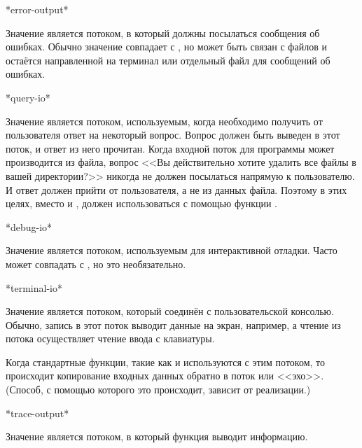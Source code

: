 \begin{defun}[Переменная]
*error-output*

Значение  является потоком, в который должны посылаться
сообщения об ошибках. Обычно значение совпадает с , но
 может быть связан с файлов и 
остаётся направленной на терминал или отдельный файл для сообщений об ошибках.
\end{defun}

\begin{defun}[Переменная]
*query-io*

Значение  является потоком, используемым, когда необходимо
получить от пользователя ответ на некоторый вопрос. Вопрос должен быть выведен в
этот поток, и ответ из него прочитан. Когда входной поток для программы может
производится из файла, вопрос <<Вы действительно хотите удалить все файлы в
вашей директории?>> никогда не должен посылаться напрямую к пользователю. И
ответ должен прийти от пользователя, а не из данных файла.
Поэтому в этих целях, вместо  и ,
должен использоваться  с помощью функции .
\end{defun}

\begin{defun}[Переменная]
*debug-io*

Значение  является потоком, используемым для интерактивной
отладки. Часто может совпадать с , но это необязательно.
\end{defun}

\begin{defun}[Переменная]
*terminal-io*

Значение  является потоком, который соединён с
пользовательской консолью. Обычно, запись в этот поток выводит данные на экран,
например, а чтение из потока осуществляет чтение ввода с клавиатуры.

Когда стандартные функции, такие как  и  используются с
этим потоком, то происходит копирование входных данных обратно в поток
или <<эхо>>. (Способ, с помощью которого это происходит, зависит от реализации.)
\end{defun}

\begin{defun}[Переменная]
*trace-output*

Значение  является потоком, в который функция 
выводит информацию.
\end{defun}

